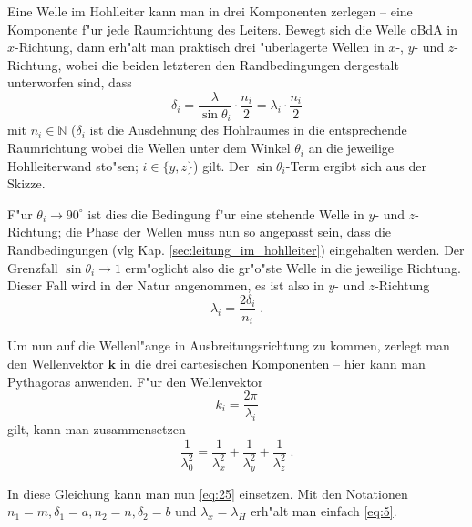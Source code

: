 \documentclass[a4paper,12pt]{article}
\renewcommand{\vec}[1]{\ensuremath{\boldsymbol{#1}}}
\begin{document}
Eine Welle im Hohlleiter kann man in drei Komponenten zerlegen -- eine
Komponente f"ur jede Raumrichtung des Leiters. Bewegt sich die Welle
oBdA in $x$-Richtung, dann erh"alt man praktisch drei "uberlagerte
Wellen in $x$-, $y$- und $z$-Richtung, wobei die beiden letzteren den
Randbedingungen dergestalt unterworfen sind, dass  
\begin{equation}
  \label{eq:26}
\delta_i = \frac{\lambda}{\sin\theta_i} \cdot \frac {n_i} 2
= 
   \lambda_i \cdot \frac {n_i} 2
\end{equation} 
mit $n_i \in \mathbb N$ ($\delta_i$ ist die Ausdehnung des
Hohlraumes in die entsprechende Raumrichtung wobei die Wellen unter
dem Winkel $\theta_i$ an die jeweilige Hohlleiterwand sto"sen; $i \in \{ y, z \}$)
gilt. 
Der $\sin \theta_i$-Term ergibt sich aus der Skizze.

F"ur $\theta_i \to 90^\circ$ ist dies die Bedingung f"ur eine stehende
Welle in $y$- und $z$-Richtung; die Phase der Wellen muss nun so
angepasst sein, dass die Randbedingungen (vlg
Kap. \ref{sec:leitung_im_hohlleiter}) eingehalten werden. Der
Grenzfall $\sin\theta_i \to 1$ erm"oglicht also die gr"o"ste Welle in
die jeweilige Richtung. Dieser Fall wird in der Natur angenommen, es
ist also in $y$- und $z$-Richtung
\begin{equation}
  \label{eq:25}
  \lambda_i = \frac{ 2 \delta_i }{ n_i } \;.
\end{equation}

Um nun auf die Wellenl"ange in Ausbreitungsrichtung zu kommen, zerlegt
man den Wellenvektor $\vec k$ in die drei cartesischen Komponenten --
hier kann man Pythagoras anwenden. F"ur den Wellenvektor 
\begin{equation*}
  k_i = \frac{ 2\pi }{\lambda_i}
\end{equation*}
gilt, kann man zusammensetzen
\begin{equation}
  \label{eq:28}
  \frac{ 1 }{ \lambda_0^2 } = 
  \frac{ 1 }{ \lambda_x^2 } +   \frac{ 1 }{ \lambda_y^2 } +   \frac{ 1
  }{ \lambda_z^2 } \;.
\end{equation}

In diese Gleichung kann man nun \eqref{eq:25} einsetzen. Mit den
Notationen $n_1 = m, \delta_1 = a, n_2 = n, \delta_2 = b$ und
$\lambda_x = \lambda_H$ erh"alt man einfach \eqref{eq:5}.



\end{document}
